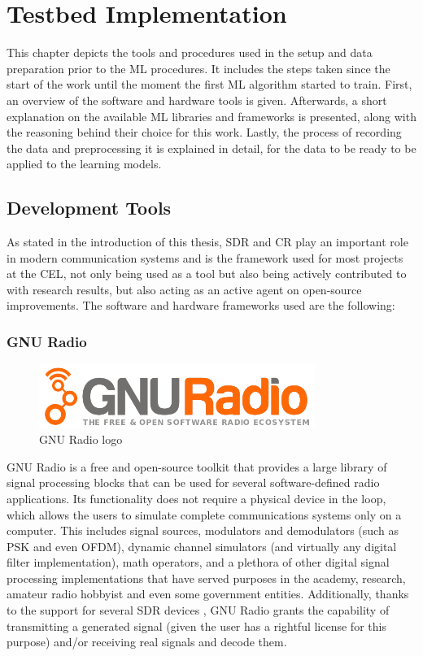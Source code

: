 \acresetall
\chapter{Testbed Implementation}\label{chapter:implementation}\label{ch:implementation}
This chapter depicts the tools and procedures used in the setup and data preparation prior to the \ac{ML} procedures. It includes the steps taken since the start of the work until the moment the first \ac{ML} algorithm started to train. First, an overview of the software and hardware tools is given. Afterwards, a short explanation on the available \ac{ML} libraries and frameworks is presented, along with the reasoning behind their choice for this work. Lastly, the process of recording the data and preprocessing it is explained in detail, for the data to be ready to be applied to the learning models.
\section{Development Tools}\label{ch:tools}
As stated in the introduction of this thesis, \ac{SDR} and \ac{CR} play an important role in modern communication systems and is the framework used for most projects at the \ac{CEL}, not only being used as a tool but also being actively contributed to with research results, but also acting as an active agent on open-source improvements. The software and hardware frameworks used are the following:
\subsection{GNU Radio}
\begin{figure}[htb]
    \centering
      \includegraphics[width=0.8\textwidth]{figures/gnuradio_logo}
      \caption{GNU Radio logo}
      \label{fig:gnuradio}
\end{figure}
GNU Radio \cite{GNURadio2016} is a free and open-source toolkit that provides a large library of signal processing blocks that can be used for several software-defined radio applications. Its functionality does not require a physical device in the loop, which allows the users to simulate complete communications systems only on a computer. This includes signal sources, modulators and demodulators (such as \ac{PSK} and even \ac{OFDM}), dynamic channel simulators (and virtually any digital filter implementation), math operators, and a plethora of other digital signal processing implementations that have served purposes in the academy, research, amateur radio hobbyist and even some government entities. Additionally, thanks to the support for several \ac{SDR} devices \cite{gnuradiohw}, GNU Radio grants the capability of transmitting a generated signal (given the user has a rightful license for this purpose) and/or receiving real signals and decode them.\\

